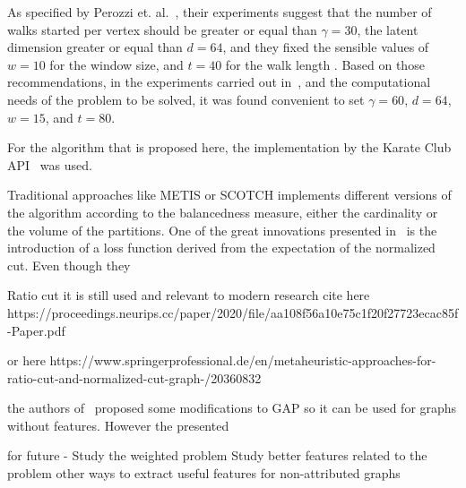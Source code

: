 As specified by Perozzi et. al.~\citep{deepwalk}, their experiments suggest that the number of walks started per vertex should be greater or equal than $\gamma=30$, the latent dimension greater or equal than $d=64$, and they fixed the sensible values of $w=10$ for the window size, and $t=40$ for the walk length . Based on those recommendations, in the experiments carried out in~\citep{deepwalk_hyper}, and the computational needs of the problem to be solved, it was found convenient to set $\gamma=60$, $d=64$, $w=15$, and $t=80$.


For the algorithm that is proposed here, the implementation by the Karate Club API~\cite{karateclub} was used.

Traditional approaches like METIS or SCOTCH implements different versions of the algorithm according to the balancedness measure, either the cardinality or the volume of the partitions. One of the great innovations presented  in~\citep{gap} is the introduction of a loss function derived from the expectation of the normalized cut. Even though they 

Ratio cut it is still used and relevant to modern research cite here https://proceedings.neurips.cc/paper/2020/file/aa108f56a10e75c1f20f27723ecac85f-Paper.pdf

or here https://www.springerprofessional.de/en/metaheuristic-approaches-for-ratio-cut-and-normalized-cut-graph-/20360832    

the authors of~\citep{gap2} proposed some modifications to GAP so it can be used for graphs without features. However the presented 

for future - Study the weighted problem
Study better features related to the problem
other ways to extract useful features for non-attributed graphs

